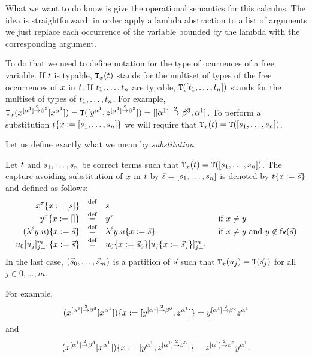 What we want to do know is give the operational semantics for this calculus.
The idea is straightforward: in order apply a lambda abstraction to a list of arguments we just
replace each occurrence of the variable bounded by the lambda with the corresponding argument.

To do that we need to define notation for the type
of ocurrences of a free variable. If $t$ is typable,
$\mathtt{T}_{x}(t)$
stands for the multiset
of types of the free occurrences of $x$ in $t$.
If $t_1,\hdots,t_n$ are typable,
$\mathtt{T}([t_1,\hdots,t_n])$ stands for the multiset
of types of $t_1,\hdots,t_n$.
For example,
$\mathtt{T}_{x}(x^{[\alpha^1] \overset{2}{\to} \beta^3}[x^{\alpha^1}]) =
\mathtt{T}([y^{\alpha^1},z^{[\alpha^1] \overset{2}{\to} \beta^3}]) = [[\alpha^1] \overset{2}{\to} \beta^3,\alpha^1]$.
To perform a substitution $t\{x := [s_1,\hdots,s_n]\}$
we will require that $\mathtt{T}_{x}(t) = \mathtt{T}([s_1,\hdots,s_n])$.


Let us define exactly what we mean by \emph{substitution}.
\begin{definition}[Substitution]
Let $t$ and $s_1,\hdots,s_n$ be correct terms such that $\mathtt{T}_{x}(t) = \mathtt{T}([s_1,\hdots,s_n])$.
The capture-avoiding substitution of $x$ in $t$ by $\vec{s} = [s_1,\hdots,s_n]$
is denoted by $t\{x := \vec{s}\}$ and defined as follows:
\[
  \begin{array}{rcll}
    x^\tau\{x := [s]\} & \overset{\mathrm{def}}{=} & s
  \\
    y^\tau\{x := []\} & \overset{\mathrm{def}}{=} & y^\tau
    & \text{ if $x \neq y$}
  \\
    (\lambda^{\ell} y. u)\{x := \vec{s}\} & \overset{\mathrm{def}}{=} &  \lambda^{\ell} y.  u\{x := \vec{s}\}
    & \text{ if $x \neq y$ and $y \not\in \mathsf{fv}({\vec{s}})$}
  \\
    u_0[u_j]_{j=1}^{m}\{x := \vec{s}\} & \overset{\mathrm{def}}{=} &
    u_0\{x := \vec{s}_0\}[u_j\{x := \vec{s}_j\}]_{j=1}^{m}
  \end{array}
\]
In the last case, $(\vec{s}_0, \hdots, \vec{s}_m)$
is a partition of $\vec{s}$
such that $\mathtt{T}_{x}(u_j) = \mathtt{T}(\vec{s}_j)$ for all $j \in {0,\hdots,m}$.
\end{definition}

For example,
\[(x^{[\alpha^1] \overset{2}{\to} \beta^3}[x^{\alpha^1}])\{x := [y^{[\alpha^1] \overset{2}{\to} \beta^3},z^{\alpha^1}]\}
= y^{[\alpha^1] \overset{2}{\to} \beta^3}z^{\alpha^1}\]
and
\[(x^{[\alpha^1] \overset{2}{\to} \beta^3}[x^{\alpha^1}])\{x := [y^{\alpha^1},z^{[\alpha^1] \overset{2}{\to} \beta^3}]\}
= z^{[\alpha^1] \overset{2}{\to} \beta^3}y^{\alpha^1}.\]


